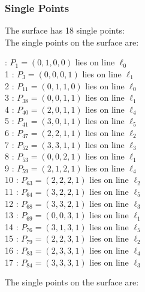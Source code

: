 \documentclass{article}
\begin{document}
{\subsubsection*{Single Points}
The surface has 18 single points:\\
The single points on the surface are:\\
\begin{multicols}{2}
 : $P_{1}=( 0, 1, 0, 0 )$ lies on line $\ell_{0}$\\
1 : $P_{3}=( 0, 0, 0, 1 )$ lies on line $\ell_{1}$\\
2 : $P_{11}=( 0, 1, 1, 0 )$ lies on line $\ell_{0}$\\
3 : $P_{38}=( 0, 0, 1, 1 )$ lies on line $\ell_{1}$\\
4 : $P_{40}=( 2, 0, 1, 1 )$ lies on line $\ell_{4}$\\
5 : $P_{41}=( 3, 0, 1, 1 )$ lies on line $\ell_{5}$\\
6 : $P_{47}=( 2, 2, 1, 1 )$ lies on line $\ell_{2}$\\
7 : $P_{52}=( 3, 3, 1, 1 )$ lies on line $\ell_{3}$\\
8 : $P_{53}=( 0, 0, 2, 1 )$ lies on line $\ell_{1}$\\
9 : $P_{59}=( 2, 1, 2, 1 )$ lies on line $\ell_{4}$\\
10 : $P_{63}=( 2, 2, 2, 1 )$ lies on line $\ell_{2}$\\
11 : $P_{64}=( 3, 2, 2, 1 )$ lies on line $\ell_{5}$\\
12 : $P_{68}=( 3, 3, 2, 1 )$ lies on line $\ell_{3}$\\
13 : $P_{69}=( 0, 0, 3, 1 )$ lies on line $\ell_{1}$\\
14 : $P_{76}=( 3, 1, 3, 1 )$ lies on line $\ell_{5}$\\
15 : $P_{79}=( 2, 2, 3, 1 )$ lies on line $\ell_{2}$\\
16 : $P_{83}=( 2, 3, 3, 1 )$ lies on line $\ell_{4}$\\
17 : $P_{84}=( 3, 3, 3, 1 )$ lies on line $\ell_{3}$\\
\end{multicols}
The single points on the surface are:\\
}
\end{document}
